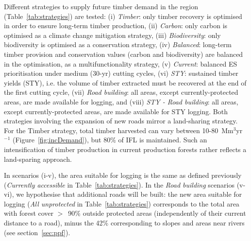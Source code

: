 \documentclass{article}
\begin{document}
Different strategies to supply future timber demand in the region (Table~\ref{tab:strategies}) are tested: (i) \textit{Timber}: only timber recovery is optimised in order to ensure long-term timber production, (ii) \textit{Carbon}: only carbon is optimised as a climate change mitigation strategy, (iii) \textit{Biodiversity}: only biodiversity is optimised as a conservation strategy, (iv) \textit{Balanced}: long-term timber provision and conservation values (carbon and biodiversity) are balanced in the optimisation, as a multifunctionality strategy, (v) \textit{Current}: balanced ES prioritisation under medium (30-yr) cutting cycles, (vi) \textit{STY}: sustained timber yields (STY), i.e. the volume of timber extracted must be recovered at the end of the first cutting cycle, (vii) \textit{Road building}: all areas, except currently-protected areas, are made available for logging, and (viii) \textit{STY - Road building}: all areas, except currently-protected areas, are made available for STY logging. Both strategies involving the expansion of new roads mirror a land-sharing strategy. For the Timber strategy, total timber harvested can vary between 10-80~Mm$^3$yr$^{-1}$ (Figure~\ref{fig:incDemand}), but 80\% of IFL is maintained. Such an intensification of timber production in current production forests rather reflects a land-sparing approach.

In scenarios (i-v), the area suitable for logging is the same as defined previously (\textit{Currently accessible} in Table~\ref{tab:strategies}). In the \textit{Road building} scenarios (v-vi), we hypothesise that additional roads will be built: the new area suitable for logging (\textit{All unprotected} in Table~\ref{tab:strategies}) corresponds to the total area with forest cover $>$~90\% outside protected areas (independently of their current distance to a road), minus the 42\% corresponding to slopes and areas near rivers (see section~\ref{sec:ppf}). 
\end{document}
